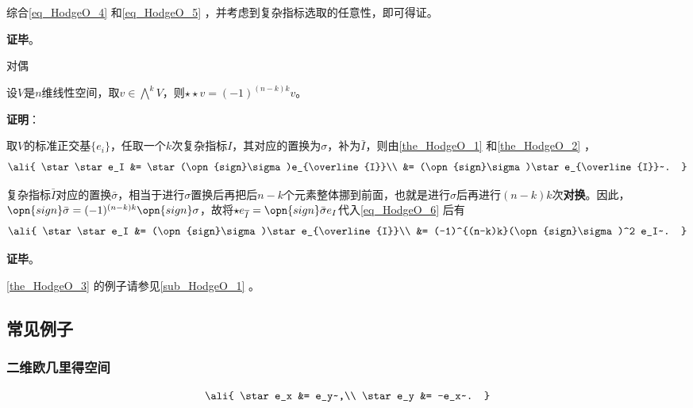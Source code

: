 综合\autoref{eq_HodgeO_4} 和\autoref{eq_HodgeO_5} ，并考虑到复杂指标选取的任意性，即可得证。


\textbf{证毕}。



\begin{theorem}{对偶}\label{the_HodgeO_3}

设$V$是$n$维线性空间，取$v\in\bigwedge^k V$，则$\star \star v = (-1)^{(n-k)k} v$。

\end{theorem}

\textbf{证明}：

取$V$的标准正交基$\{e_i\}$，任取一个$k$次复杂指标$I$，其对应的置换为$\sigma$，补为$\bar{I}$，则由\autoref{the_HodgeO_1} 和\autoref{the_HodgeO_2} ，
\begin{equation}\label{eq_HodgeO_6}
\ali{
    \star \star e_I &= \star(\opn{sign}\sigma)e_{\overline{I}}\\
    &= (\opn{sign}\sigma)\star e_{\overline{I}}~.
}
\end{equation}

复杂指标$\bar{I}$对应的置换$\bar{\sigma}$，相当于进行$\sigma$置换后再把后$n-k$个元素整体挪到前面，也就是进行$\sigma$后再进行$(n-k)k$次\textbf{对换}。因此，$\opn{sign}\bar{\sigma}=(-1)^{(n-k)k}\opn{sign}\sigma$，故将$\star e_{\overline{I}}=\opn{sign}\bar{\sigma}e_I$代入\autoref{eq_HodgeO_6} 后有
\begin{equation}
\ali{
    \star \star e_I &= (\opn{sign}\sigma)\star e_{\overline{I}}\\
    &= (-1)^{(n-k)k}(\opn{sign}\sigma)^2 e_I~.
}
\end{equation}

\textbf{证毕}。

\autoref{the_HodgeO_3} 的例子请参见\autoref{sub_HodgeO_1} 。



\subsection{常见例子}\label{sub_HodgeO_1}


\subsubsection{二维欧几里得空间}


\begin{equation}
\ali{
    \star e_x &= e_y~,\\
    \star e_y &= -e_x~.
}
\end{equation}


